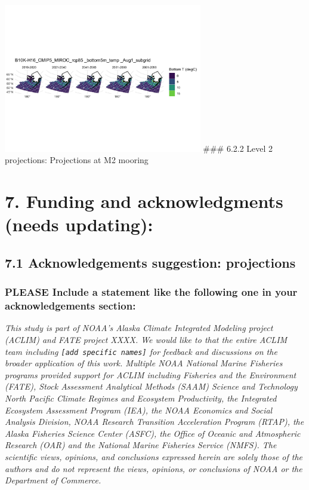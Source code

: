 \documentclass[
]{article}
\begin{document}
\includegraphics[width=0.65\textwidth,height=\textheight]{Figs/sub_grid_mn_BT_Aug1.jpg}
\#\#\# 6.2.2 Level 2 projections: Projections at M2 mooring

\hypertarget{funding-and-acknowledgments-needs-updating}{%
\section{7. Funding and acknowledgments (needs
updating):}\label{funding-and-acknowledgments-needs-updating}}

\hypertarget{acknowledgements-suggestion-projections}{%
\subsection{7.1 Acknowledgements suggestion:
projections}\label{acknowledgements-suggestion-projections}}

\hypertarget{please-include-a-statement-like-the-following-one-in-your-acknowledgements-section}{%
\subsubsection{PLEASE Include a statement like the following one in your
acknowledgements
section:}\label{please-include-a-statement-like-the-following-one-in-your-acknowledgements-section}}

\emph{This study is part of NOAA's Alaska Climate Integrated Modeling
project (ACLIM) and FATE project XXXX. We would like to that the entire
ACLIM team including \texttt{{[}add\ specific\ names{]}} for feedback
and discussions on the broader application of this work. Multiple NOAA
National Marine Fisheries programs provided support for ACLIM including
Fisheries and the Environment (FATE), Stock Assessment Analytical
Methods (SAAM) Science and Technology North Pacific Climate Regimes and
Ecosystem Productivity, the Integrated Ecosystem Assessment Program
(IEA), the NOAA Economics and Social Analysis Division, NOAA Research
Transition Acceleration Program (RTAP), the Alaska Fisheries Science
Center (ASFC), the Office of Oceanic and Atmospheric Research (OAR) and
the National Marine Fisheries Service (NMFS). The scientific views,
opinions, and conclusions expressed herein are solely those of the
authors and do not represent the views, opinions, or conclusions of NOAA
or the Department of Commerce.}
\end{document}
